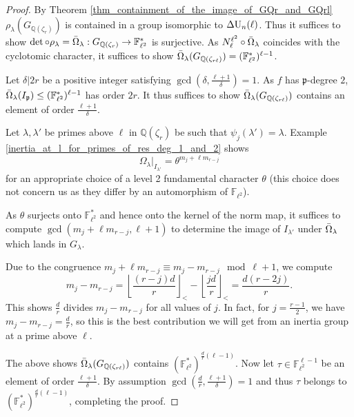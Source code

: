 \documentclass[10pt,a4paper]{amsart}
\DeclareMathOperator{\DU}{\Delta {\rm U}}
\newcommand{\FF}{\mathbb{F}}
\newcommand{\GQr}{G_{\QQ(\zeta_{r})}}
\newcommand{\GQrl}{G_{\QQ(\zeta_{r\ell})}}
\newcommand{\Glam}{G_{\lambda}}
\newcommand{\QQ}{\mathbb{Q}}
\newcommand{\Qr}{{\QQ(\zeta_r)}}
\newcommand{\p}{\mathfrak{p}}
\begin{document}
\begin{proof}
By Theorem \ref{thm_containment_of_the_image_of_GQr_and_GQrl} $\rho_\lambda(\GQr)$ is contained in a group isomorphic to $ \DU_n(\ell)$.
Thus it suffices to show $\det \circ \rho_\lambda = \Bar{\Omega}_\lambda : \GQr \rightarrow \FF_{\ell^2}^*$ is surjective. As $N^{\ell^2}_{\ell} \circ \Bar{\Omega}_\lambda$ coincides with the cyclotomic character, it suffices to show $\Bar{\Omega}_\lambda(\GQrl) = (\FF_{\ell^2}^*)^{\ell -1}$.

 Let $\delta|2r$ be a positive integer satisfying $\gcd(\delta, \frac{\ell+1}{\delta})=1$.
 As $f$ has $\p$-degree $2$, $\Bar{\Omega}_\lambda(I_\p) \leq (\FF^*_{\ell^2})^{\ell-1}$ has order $2r$.
It thus suffices to show $\Bar{\Omega}_\lambda(\GQrl)$ contains an element of order $\frac{\ell+1}{\delta}$.

Let $\lambda,\lambda'$ be primes above $\ell$ in $\Qr$ be such that $\psi_j(\lambda')=\lambda$. Example \ref{inertia_at_l_for_primes_of_res_deg_1_and_2} shows
\[
\Omega_\lambda|_{I_{\lambda'}} = \theta^{m_{j} + \ell m_{r-j} }
\]
for an appropriate choice of a level 2 fundamental character $\theta$ (this choice does not concern us as they differ by an automorphism of $\FF_{\ell^2}$).

As $\theta$ surjects onto $\FF_{\ell^2}^*$  and hence onto the kernel of the norm map, it suffices to compute  $\gcd(m_{j} + \ell m_{r-j} , \ell + 1)$ to determine the image of $I_{\lambda'}$ under $\Bar{\Omega}_\lambda$ which lands in $\Glam$.


Due to the congruence $m_{j} + \ell m_{r-j} \equiv m_{j} - m_{r-j}  \mod{ \ell + 1}$, we compute
\[m_{j} - m_{r-j} = \left\lfloor \frac{(r-j)d}{r}\right\rfloor_< - \left\lfloor \frac{jd}{r}\right\rfloor_< = \frac{d(r-2j)}{r}.
\]
This shows  $\frac{d}{r}$ divides $ m_{j} - m_{r-j}$ for all values of $j$. In fact, for $j = \frac{r-1}{2}$, we have $ m_{j} - m_{r-j} = \frac{d}{r}$, so this is the best contribution we will get from an inertia group at a prime above $\ell$.

The above shows $\Bar{\Omega}_\lambda(\GQrl)$ contains $(\FF^*_{\ell^2})^{\frac{d}{r}(\ell-1)}$.
Now let $\tau \in \FF_{\ell^2}^{\ell-1}$ be an element of order $\frac{\ell+1}{\delta}$.
By assumption $\gcd(\frac{d}{r},\frac{\ell+1}{\delta})=1$ and thus $\tau$ belongs to $(\FF^*_{\ell^2})^{\frac{d}{r}(\ell-1)}$, completing the proof.

\end{proof}
\end{document}
